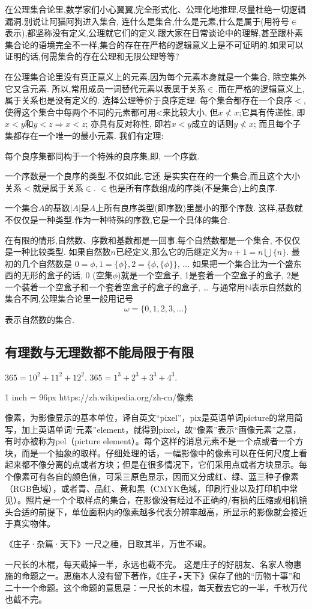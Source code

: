 \documentclass[main.tex]{subfiles}
\begin{document}
{在公理集合论里,数学家们小心翼翼,完全形式化、公理化地推理,尽量杜绝一切逻辑漏洞.别说让阿猫阿狗进入集合, 连什么是集合,什么是元素,什么是属于(用符号$\in$表示),都坚称没有定义,公理就它们的定义.跟大家在日常谈论中的理解,甚至跟朴素集合论的语境完全不一样,集合的存在在严格的逻辑意义上是不可证明的.如果可以证明的话,何需集合的存在公理和无限公理等等?

在公理集合论里没有真正意义上的元素,因为每个元素本身就是一个集合, 除空集外它又含元素. 所以,常用成员一词替代元素以表属于关系$\in$.而在严格的逻辑意义上,属于关系也是没有定义的.
选择公理等价于良序定理: 每个集合都存在一个良序$<$,使得这个集合中每两个不同的元素都可用<来比较大小, 但$x\nless x$;它具有传递性, 即 $x<y$和$y<z \Rightarrow x<z$; 
亦具有反对称性, 即若$x<y$成立的话则$y\nless x$;
而且每个子集都存在一个唯一的最小元素.
我们有定理:
\begin{kaishu}每个良序集都同构于一个特殊的良序集,即,
一个序数.
\end{kaishu}一个序数是一个良序的类型.不仅如此,它还
是实实在在的一个集合,而且这个大小关系$<$就是属于关系$\in$.
$\in$也是所有序数组成的序类(不是集合)上的良序.

一个集合$A$的基数$|A|$是$A$上所有良序类型(即序数)里最小的那个序数.
这样,基数就不仅仅是一种类型.作为一种特殊的序数,它是一个具体的集合.

在有限的情形,自然数、序数和基数都是一回事.每个自然数都是一个集合,
不仅仅是一种比较类型.
如果自然数$n$已经定义,那么它的后继定义为$n+1= n\bigcup \{n\}$.
最初的几个自然数是
$0 = \phi, 1 = \{\phi\}, 2 = \{\phi, \{\phi\}\}, \,\dots$
如果把一个集合比为一个盛东西的无形的盒子的话, 0 (空集$\phi$)就是一个空盒子, 1是套着一个空盒子的盒子,
2是一个装着一个空盒子和一个套着空盒子的盒子的盒子, \dots
与通常用$\mathbb{N}$表示自然数的集合不同,公理集合论里一般用记号
$$\omega = \{0, 1, 2, 3, \dots\}$$
表示自然数的集合.

} %

\subsection{有理数与无理数都不能局限于有限}

$365=10^2+11^2+12^2$.
$365=1^3+2^3+3^3+4^3$.


1 inch = 96px
https://zh.wikipedia.org/zh-cn/像素

像素，为影像显示的基本单位，译自英文“pixel”，pix是英语单词picture的常用简写，加上英语单词“元素”element，就得到pixel，故“像素”表示“画像元素”之意，有时亦被称为pel（picture element）。每个这样的消息元素不是一个点或者一个方块，而是一个抽象的取样。仔细处理的话，一幅影像中的像素可以在任何尺度上看起来都不像分离的点或者方块；但是在很多情况下，它们采用点或者方块显示。每个像素可有各自的颜色值，可采三原色显示，因而又分成红、绿、蓝三种子像素（RGB色域），或者青、品红、黄和黑（CMYK色域，印刷行业以及打印机中常见）。照片是一个个取样点的集合，在影像没有经过不正确的/有损的压缩或相机镜头合适的前提下，单位面积内的像素越多代表分辨率越高，所显示的影像就会接近于真实物体。


《庄子·杂篇·天下》一尺之棰，日取其半，万世不竭。

一尺长的木棍，每天截掉一半，永远也截不完。
这是庄子的好朋友、名家人物惠施的命题之一。惠施本人没有留下著作，《庄子•天下》保存了他的“历物十事”和二十一个命题。这个命题的意思是：一尺长的木棍，每天截去它的一半，千秋万代也截不完。
\end{document}
